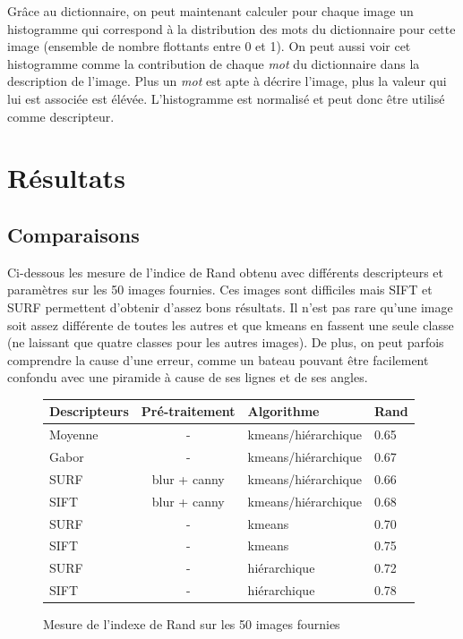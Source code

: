 \documentclass[12pt,a4paper,utf8x]{report}
\begin{document}
        Grâce au dictionnaire, on peut maintenant calculer pour chaque image un histogramme qui correspond à la distribution des mots du dictionnaire pour cette image (ensemble de nombre flottants entre 0 et 1). On peut aussi voir cet histogramme comme la contribution de chaque \textit{mot} du dictionnaire dans la description de l'image. Plus un \textit{mot} est apte à décrire l'image, plus la valeur qui lui est associée est élévée. L'histogramme est normalisé et peut donc être utilisé comme descripteur.


\chapter{Résultats}

\section{Comparaisons}
  Ci-dessous les mesure de l'indice de Rand obtenu avec différents descripteurs et paramètres sur les 50 images fournies. Ces images sont difficiles mais SIFT et SURF permettent d'obtenir d'assez bons résultats. Il n'est pas rare qu'une image soit assez différente de toutes les autres et que kmeans en fassent une seule classe (ne laissant que quatre classes pour les autres images). De plus, on peut parfois comprendre la cause d'une erreur, comme un bateau pouvant être facilement confondu avec une piramide à cause de ses lignes et de ses angles.

  \begin{figure}[!h]
      \centering
        \begin{tabular}{ | l | c | l | l |}
          \hline
          Descripteurs & Pré-traitement & Algorithme & Rand \\
          \hline
            Moyenne & -             & kmeans/hiérarchique   & 0.65\\
            Gabor   & -             & kmeans/hiérarchique   & 0.67\\
            SURF    & blur + canny  & kmeans/hiérarchique   & 0.66\\
            SIFT    & blur + canny  & kmeans/hiérarchique   & 0.68\\
            SURF    & -             & kmeans                & 0.70\\
            SIFT    & -             & kmeans                & 0.75\\
            SURF    & -             & hiérarchique          & 0.72\\
            SIFT    & -             & hiérarchique          & 0.78\\
          \hline  
        \end{tabular}
    \caption{Mesure de l'indexe de Rand sur les 50 images fournies}
  \end{figure}
\end{document}
